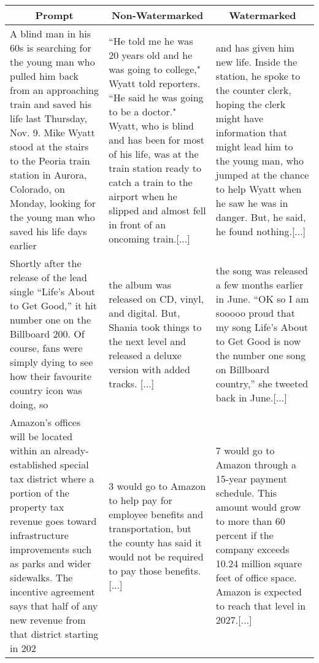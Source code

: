 \begin{table}[h]
\centering
\small
\renewcommand*{\arraystretch}{2.0}
\begin{tabular}{p{}|p{}|p{}}
\toprule
\multicolumn{1}{c}{Prompt} & \multicolumn{1}{c}{Non-Watermarked} & \multicolumn{1}{c}{Watermarked}  \\\midrule
A blind man in his 60s is searching for the young man who pulled him back from an approaching train and saved his life last Thursday, Nov. 9.
Mike Wyatt stood at the stairs to the Peoria train station in Aurora, Colorado, on Monday, looking for the young man who saved his life days earlier 
& 
``He told me he was 20 years old and he was going to college," Wyatt told reporters. ``He said he was going to be a doctor."
Wyatt, who is blind and has been for most of his life, was at the train station ready to catch a train to the airport when he slipped and almost fell in front of an oncoming train.[...]
& 
and has given him new life.
Inside the station, he spoke to the counter clerk, hoping the clerk might have information that might lead him to the young man, who jumped at the chance to help Wyatt when he saw he was in danger. But, he said, he found nothing.[...]
\\\hline
[...]
Shortly after the release of the lead single “Life’s About to Get Good,” it hit number one on the Billboard 200. Of course, fans were simply dying to see how their favourite country icon was doing, so
 &
 the album was released on CD, vinyl, and digital. But, Shania took things to the next level and released a deluxe version with added tracks. [...]
 &
 the song was released a few months earlier in June.
``OK so I am sooooo proud that my song Life's About to Get Good is now the number one song on Billboard country,” she tweeted back in June.[...]
 \\\hline
 [..] Amazon’s offices will be located within an already-established special tax district where a portion of the property tax revenue goes toward infrastructure improvements such as parks and wider sidewalks.
The incentive agreement says that half of any new revenue from that district starting in 202
 &
 3 would go to Amazon to help pay for employee benefits and transportation, but the county has said it would not be required to pay those benefits.[...]
 &
 7 would go to Amazon through a 15-year payment schedule. This amount would grow to more than 60 percent if the company exceeds 10.24 million square feet of office space. Amazon is expected to reach that level in 2027.[...] \\\hline


\end{tabular}
\end{table}
